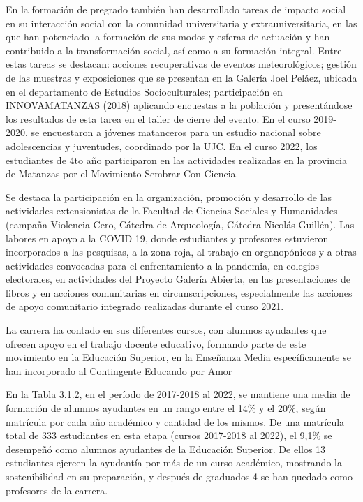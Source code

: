 En la formación de pregrado también han desarrollado tareas de impacto social en su interacción social con la comunidad universitaria y extrauniversitaria, en las que han potenciado la formación de sus modos y esferas de actuación y han contribuido a la transformación social, así como a su formación integral. Entre estas tareas se destacan: acciones recuperativas de eventos meteorológicos; gestión de las muestras y exposiciones que se presentan en la Galería Joel Peláez, ubicada en el departamento de Estudios Socioculturales; participación en INNOVAMATANZAS (2018) aplicando encuestas a la población y presentándose los resultados de esta tarea en el taller de cierre del evento. En el curso 2019-2020, se encuestaron a jóvenes matanceros para un estudio nacional sobre adolescencias y juventudes, coordinado por la UJC. En el curso 2022, los estudiantes de 4to año participaron en las actividades realizadas en la provincia de Matanzas por el Movimiento Sembrar Con Ciencia. 

Se destaca la participación en la organización, promoción y desarrollo de las actividades extensionistas de la Facultad de Ciencias Sociales y Humanidades (campaña Violencia Cero, Cátedra de Arqueología, Cátedra Nicolás Guillén). Las labores en apoyo a la COVID 19, donde estudiantes y profesores estuvieron incorporados a las pesquisas, a la zona roja, al trabajo en organopónicos y a otras actividades convocadas para el enfrentamiento a la pandemia, en colegios electorales, en actividades del Proyecto Galería Abierta, en las presentaciones de libros y en acciones comunitarias en circunscripciones, especialmente las acciones de apoyo comunitario integrado realizadas durante el curso 2021.

La carrera ha contado en sus diferentes cursos, con alumnos ayudantes que ofrecen apoyo en el trabajo docente educativo, formando parte de este movimiento en la Educación Superior, en la Enseñanza Media específicamente se han incorporado al Contingente Educando por Amor 



En la Tabla 3.1.2, en el período de 2017-2018 al 2022, se mantiene una media de formación de alumnos ayudantes en un rango entre el 14\% y el 20\%, según matrícula por cada año académico y cantidad de los mismos. De una matrícula total de 333 estudiantes en esta etapa (cursos 2017-2018 al 2022), el 9,1\% se desempeñó como alumnos ayudantes de la Educación Superior. De ellos 13 estudiantes ejercen la ayudantía por más de un curso académico, mostrando la sostenibilidad en su preparación, y después de graduados 4 se han quedado como profesores de la carrera. 

